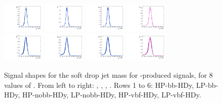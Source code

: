 \begin{figure}[htbp]
  \includegraphics[width=0.18\textwidth]{fig/analysisAppendix/templateSignalVsMX_fromDC_VBFGbuToWW_MJJ_mu_HP_vbf_HDy.pdf}
  \includegraphics[width=0.18\textwidth]{fig/analysisAppendix/templateSignalVsMX_fromDC_VBFRadToWW_MJJ_mu_HP_vbf_HDy.pdf}
  \includegraphics[width=0.18\textwidth]{fig/analysisAppendix/templateSignalVsMX_fromDC_VBFZprToWW_MJJ_mu_HP_vbf_HDy.pdf}
  \includegraphics[width=0.18\textwidth]{fig/analysisAppendix/templateSignalVsMX_fromDC_VBFWprToWZ_MJJ_mu_HP_vbf_HDy.pdf}\\
  \includegraphics[width=0.18\textwidth]{fig/analysisAppendix/templateSignalVsMX_fromDC_VBFGbuToWW_MJJ_mu_LP_vbf_HDy.pdf}
  \includegraphics[width=0.18\textwidth]{fig/analysisAppendix/templateSignalVsMX_fromDC_VBFRadToWW_MJJ_mu_LP_vbf_HDy.pdf}
  \includegraphics[width=0.18\textwidth]{fig/analysisAppendix/templateSignalVsMX_fromDC_VBFZprToWW_MJJ_mu_LP_vbf_HDy.pdf}
  \includegraphics[width=0.18\textwidth]{fig/analysisAppendix/templateSignalVsMX_fromDC_VBFWprToWZ_MJJ_mu_LP_vbf_HDy.pdf}\\
  \caption{
    Signal shapes for the soft drop jet mass \MJ for \VBF-produced signals, for 8 values of \MX.
    From left to right: \GBulktoWW, \RadtoWW, \ZprtoWW, \WprtoWZ.
    Rows 1 to 6: HP-bb-HDy, LP-bb-HDy, HP-nobb-HDy, LP-nobb-HDy, HP-vbf-HDy, LP-vbf-HDy.
  }
  \label{fig:MJJShapes_VBF_HDy}
\end{figure}

